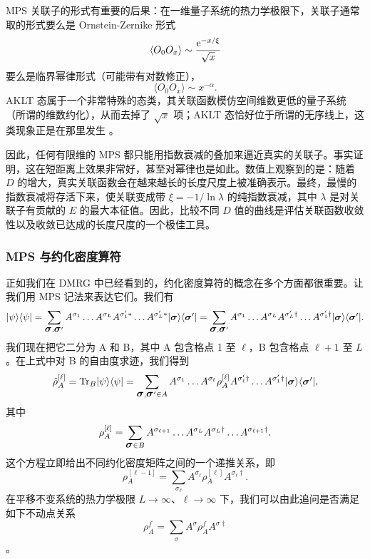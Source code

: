 \documentclass[a4paper,10pt,oneside,onecolumn,1p,times]{elsarticle}
\newcommand{\tr}{{\rm Tr }}
\newcommand{\eul}{{\rm e }}
\newcommand{\bra}[1]{\mbox{$\langle #1  |$}}
\newcommand{\ket}[1]{\mbox{$| #1  \rangle$}}
\newcommand{\fat}[1]{\mbox{\boldmath$#1$\unboldmath}}	%
\begin{document}
MPS 关联子的形式有重要的后果：在一维量子系统的热力学极限下，关联子通常取的形式要么是 Ornstein-Zernike 形式
\begin{equation}
\langle O_0 O_x \rangle \sim \frac{\eul^{-x/\xi}}{\sqrt{x}}
\end{equation}
要么是临界幂律形式（可能带有对数修正），
\begin{equation}
\langle O_0 O_x \rangle \sim x^{-\alpha} .
\end{equation}
AKLT 态属于一个非常特殊的态类，其关联函数模仿空间维数更低的量子系统（所谓的维数约化），从而去掉了 $\sqrt{x}$ 项；AKLT 态恰好位于所谓的无序线上，这类现象正是在那里发生 \cite{Garel96}。

因此，任何有限维的 MPS 都只能用指数衰减的叠加来逼近真实的关联子。事实证明，这在短距离上效果非常好，甚至对幂律也是如此。数值上观察到的是：随着 $D$ 的增大，真实关联函数会在越来越长的长度尺度上被准确表示。最终，最慢的指数衰减将存活下来，使关联变成带 $\xi =  -1/\ln \lambda$ 的纯指数衰减，其中 $\lambda$ 是对关联子有贡献的 $E$ 的最大本征值。因此，比较不同 $D$ 值的曲线是评估关联函数收敛性以及收敛已达成的长度尺度的一个极佳工具。

\subsubsection{MPS 与约化密度算符}
正如我们在 DMRG 中已经看到的，约化密度算符的概念在多个方面都很重要。让我们用 MPS 记法来表达它们。我们有
\begin{equation}
\ket{\psi}\bra{\psi} = \sum_{\fat{\sigma},\fat{\sigma}'} A^{\sigma_1} \ldots A^{\sigma_L} A^{\sigma'_1*} \ldots A^{\sigma'_L*} \ket{\fat{\sigma}} \bra{\fat{\sigma}'} =
\sum_{\fat{\sigma},\fat{\sigma}'} A^{\sigma_1} \ldots A^{\sigma_L} A^{\sigma'_L\dagger} \ldots A^{\sigma'_1\dagger} \ket{\fat{\sigma}} \bra{\fat{\sigma}'} .
\label{eq:fullstateprojector}
\end{equation}
我们现在把它二分为 A 和 B，其中 A 包含格点 1 至 $\ell$，B 包含格点 $\ell+1$ 至 $L$。在上式中对 B 的自由度求迹，我们得到
\begin{equation}
\hat{\rho}_A^{[\ell]} = \tr_B \ket{\psi}\bra{\psi} = \sum_{\fat{\sigma},\fat{\sigma}'\in A}
A^{\sigma_1} \ldots A^{\sigma_\ell} \rho_A^{[\ell]} A^{\sigma'_\ell\dagger} \ldots A^{\sigma'_1\dagger} \ket{\fat{\sigma}} \bra{\fat{\sigma}'} ,
\end{equation}
其中
\begin{equation}
\rho_A^{[\ell]} =  \sum_{\fat{\sigma}\in B} A^{\sigma_{\ell+1}} \ldots A^{\sigma_L} A^{\sigma_L\dagger} \ldots A^{\sigma_{\ell+1}\dagger} .
\end{equation}
这个方程立即给出不同约化密度矩阵之间的一个递推关系，即
\begin{equation}
\rho_A^{[\ell-1]} = \sum_{\sigma_\ell} A^{\sigma_\ell} \rho_A^{[\ell]} A^{\sigma_\ell\dagger} .
\label{eq:rhoarecursion}
\end{equation}
在平移不变系统的热力学极限 $L\rightarrow\infty$、$\ell\rightarrow\infty$ 下，我们可以由此追问是否满足如下不动点关系
\begin{equation}
\rho_A^f = \sum_{\sigma} A^{\sigma} \rho_A^{f} A^{\sigma\dagger}
\end{equation}
。
\end{document}
